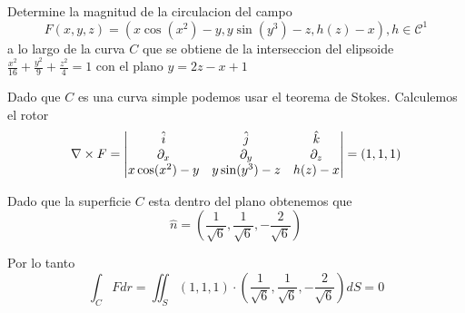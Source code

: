 \documentclass[../main.tex]{subfiles}
\begin{document}
\begin{problem}
  Determine la magnitud de la circulacion del campo
  \begin{equation*}
    F(x, y, z) = (x \cos(x^{2}) - y, y \sin(y^{3}) - z, h(z) - x), h \in \mathcal{C^{1}}
  \end{equation*}
  a lo largo de la curva $C$ que se obtiene de la interseccion del elipsoide $\frac{x^{2}}{16} + \frac{y^{2}}{9} + \frac{z^{2}}{4} = 1$ con el plano $y = 2z - x + 1$
\end{problem}
\begin{solution}
  Dado que $C$ es una curva simple podemos usar el teorema de Stokes. Calculemos el rotor
  \begin{equation*}
    \nabla \times F = \begin{vmatrix} \hat{i} & \hat{j} & \hat{k}\\ \partial_x & \partial_y & \partial_z\\ x \cos(x^{2}) - y & y \sin(y^{3}) - z & h(z) - x\end{vmatrix} = (1, 1, 1)
  \end{equation*}

  Dado que la superficie $C$ esta dentro del plano obtenemos que
  \begin{equation*}
    \hat{n} = (\frac{1}{\sqrt{6}}, \frac{1}{\sqrt{6}}, -\frac{2}{\sqrt{6}})
  \end{equation*}

  Por lo tanto
  \begin{equation*}
    \int_{C} F dr = \iint_{S} (1, 1, 1) \cdot (\frac{1}{\sqrt{6}}, \frac{1}{\sqrt{6}}, -\frac{2}{\sqrt{6}}) dS = 0
  \end{equation*}
\end{solution}
\end{document}
